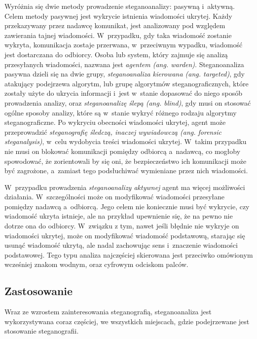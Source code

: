 \documentclass[a4paper, twoside, 12pt]{report}
\begin{document}
        Wyróżnia się dwie metody prowadzenie steganoanalizy: pasywną i~aktywną.
        Celem metody pasywnej jest wykrycie istnienia wiadomości ukrytej. Każdy przekazywany
        przez nadawcę komunikat, jest analizowany pod względem zawierania tajnej wiadomości.
        W~przypadku, gdy taka wiadomość zostanie wykryta, komunikacja zostaje przerwana,
        w~przeciwnym wypadku, wiadomość jest dostarczana do odbiorcy. Osoba lub system,
        który zajmuje się analizą przesyłanych wiadomości, nazwana jest \emph{agentem (ang. warden)}.
        Steganoanaliza pasywna dzieli się na dwie grupy, \emph{steganoanaliza kierowana (ang. targeted)}, gdy
        atakujący podejrzewa algorytm, lub grupę algorytmów steganograficznych,
        które zostały użyte do ukrycia informacji i~jest w~stanie dopasować do
        niego sposób prowadzenia analizy, oraz \emph{steganoanalizę ślepą (ang. blind)},
        gdy musi on stosować ogólne sposoby analizy, które są w~stanie wykryć różnego
        rodzaju algorytmy steganograficzne. Po wykryciu obecności wiadomości ukrytej,
        agent może przeprowadzić \emph{steganografię śledczą, inaczej wywiadowczą (ang. forensic steganalysis)},
        w~celu wydobycia treści wiadomości ukrytej. W~takim przypadku nie musi on
        blokować komunikacji pomiędzy odbiorcą a~nadawcą, co mogłoby spowodować,
        że zorientowali by się oni, że bezpieczeństwo ich komunikacji może być zagrożone,
        a~zamiast tego podsłuchiwać wymieniane przez nich wiadomości.

        W~przypadku prowadzenia \emph{steganoanalizy aktywnej} agent ma więcej możliwości
        działania. W~szczególności może on modyfikować wiadomości przesyłane pomiędzy
        nadawcą a~odbiorcą. Jego celem nie koniecznie musi być wykrycie, czy wiadomość
        ukryta istnieje, ale na przykład upewnienie się, że na pewno nie dotrze ona
        do odbiorcy. W~związku z tym, nawet jeśli błędnie nie wykryje on wiadomości ukrytej,
        może on modyfikować wiadomość podstawową, starając się usunąć wiadomość ukrytą,
        ale nadal zachowując sens i~znaczenie wiadomości podstawowej. Tego typu analiza
        najczęściej skierowana jest przeciwko omówionym wcześniej znakom wodnym,
        oraz cyfrowym odciskom palców.\cite[Rozdział 13]{DIGITALWATERMARKING}

        \subsection{Zastosowanie}
        Wraz ze wzrostem zainteresowania steganografią, steganoanaliza jest wykorzystywana
        coraz częściej, we wszystkich miejscach, gdzie podejrzewane jest stosowanie
        steganografii.
\end{document}
